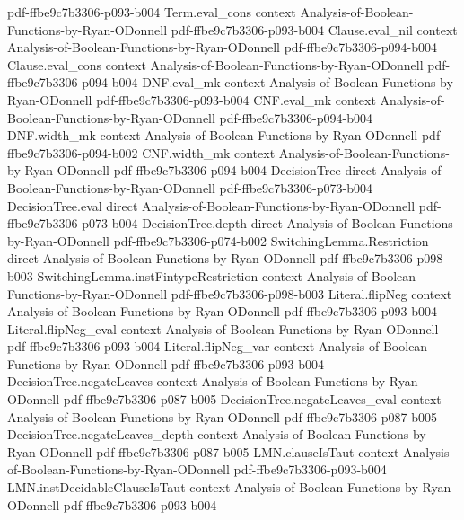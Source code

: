 \begin{lemma}
  {pdf-ffbe9c7b3306-p093-b004}
\proofstep
  {Term.eval_cons}
  {context}
  {Analysis-of-Boolean-Functions-by-Ryan-ODonnell}
  {pdf-ffbe9c7b3306-p093-b004}
\proofstep
  {Clause.eval_nil}
  {context}
  {Analysis-of-Boolean-Functions-by-Ryan-ODonnell}
  {pdf-ffbe9c7b3306-p094-b004}
\proofstep
  {Clause.eval_cons}
  {context}
  {Analysis-of-Boolean-Functions-by-Ryan-ODonnell}
  {pdf-ffbe9c7b3306-p094-b004}
\proofstep
  {DNF.eval_mk}
  {context}
  {Analysis-of-Boolean-Functions-by-Ryan-ODonnell}
  {pdf-ffbe9c7b3306-p093-b004}
\proofstep
  {CNF.eval_mk}
  {context}
  {Analysis-of-Boolean-Functions-by-Ryan-ODonnell}
  {pdf-ffbe9c7b3306-p094-b004}
\proofstep
  {DNF.width_mk}
  {context}
  {Analysis-of-Boolean-Functions-by-Ryan-ODonnell}
  {pdf-ffbe9c7b3306-p094-b002}
\proofstep
  {CNF.width_mk}
  {context}
  {Analysis-of-Boolean-Functions-by-Ryan-ODonnell}
  {pdf-ffbe9c7b3306-p094-b004}
\proofstep
  {DecisionTree}
  {direct}
  {Analysis-of-Boolean-Functions-by-Ryan-ODonnell}
  {pdf-ffbe9c7b3306-p073-b004}
\proofstep
  {DecisionTree.eval}
  {direct}
  {Analysis-of-Boolean-Functions-by-Ryan-ODonnell}
  {pdf-ffbe9c7b3306-p073-b004}
\proofstep
  {DecisionTree.depth}
  {direct}
  {Analysis-of-Boolean-Functions-by-Ryan-ODonnell}
  {pdf-ffbe9c7b3306-p074-b002}
\proofstep
  {SwitchingLemma.Restriction}
  {direct}
  {Analysis-of-Boolean-Functions-by-Ryan-ODonnell}
  {pdf-ffbe9c7b3306-p098-b003}
\proofstep
  {SwitchingLemma.instFintypeRestriction}
  {context}
  {Analysis-of-Boolean-Functions-by-Ryan-ODonnell}
  {pdf-ffbe9c7b3306-p098-b003}
\proofstep
  {Literal.flipNeg}
  {context}
  {Analysis-of-Boolean-Functions-by-Ryan-ODonnell}
  {pdf-ffbe9c7b3306-p093-b004}
\proofstep
  {Literal.flipNeg_eval}
  {context}
  {Analysis-of-Boolean-Functions-by-Ryan-ODonnell}
  {pdf-ffbe9c7b3306-p093-b004}
\proofstep
  {Literal.flipNeg_var}
  {context}
  {Analysis-of-Boolean-Functions-by-Ryan-ODonnell}
  {pdf-ffbe9c7b3306-p093-b004}
\proofstep
  {DecisionTree.negateLeaves}
  {context}
  {Analysis-of-Boolean-Functions-by-Ryan-ODonnell}
  {pdf-ffbe9c7b3306-p087-b005}
\proofstep
  {DecisionTree.negateLeaves_eval}
  {context}
  {Analysis-of-Boolean-Functions-by-Ryan-ODonnell}
  {pdf-ffbe9c7b3306-p087-b005}
\proofstep
  {DecisionTree.negateLeaves_depth}
  {context}
  {Analysis-of-Boolean-Functions-by-Ryan-ODonnell}
  {pdf-ffbe9c7b3306-p087-b005}
\proofstep
  {LMN.clauseIsTaut}
  {context}
  {Analysis-of-Boolean-Functions-by-Ryan-ODonnell}
  {pdf-ffbe9c7b3306-p093-b004}
\proofstep
  {LMN.instDecidableClauseIsTaut}
  {context}
  {Analysis-of-Boolean-Functions-by-Ryan-ODonnell}
  {pdf-ffbe9c7b3306-p093-b004}

\end{lemma}
